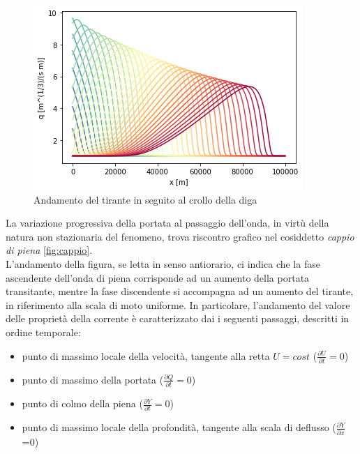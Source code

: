 \documentclass[12pt]{article} %
\begin{document}
\begin{figure} [H]
    \centering
    \includegraphics{Onda.png}
    \caption{Andamento del tirante in seguito al crollo della diga}
    \label{fig:onda}
\end{figure}

\noindent La variazione progressiva della portata al passaggio dell'onda, in virtù della natura non stazionaria del fenomeno, trova riscontro grafico nel cosiddetto \textit{cappio di piena} \ref{fig:cappio}. \\ L'andamento della figura, se letta in senso antiorario, ci indica che la fase ascendente dell'onda di piena corrisponde ad un aumento della portata transitante, mentre la fase discendente si accompagna ad un aumento del tirante, in riferimento alla scala di moto uniforme. In particolare, l'andamento del valore delle proprietà della corrente è caratterizzato dai i seguenti passaggi, descritti in ordine temporale:
\begin{itemize}
    \item punto di massimo locale della velocità, tangente alla retta $U=cost$ ($\frac{\partial U}{\partial t}=0$)
    \item punto di massimo della portata ($\frac{\partial Q}{\partial t}=0$)
    \item punto di colmo della piena ($\frac{\partial Y}{\partial t}=0$)
    \item punto di massimo locale della profondità, tangente alla scala di deflusso ($\frac{\partial Y}{\partial x}$=0)
\end{itemize}
\end{document}
